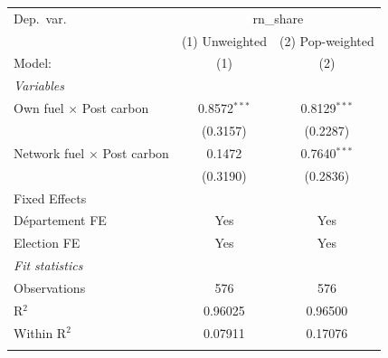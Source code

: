 \begingroup
\centering
\begin{tabular}{lcc}
   \tabularnewline \midrule \midrule
   Dep.\ var. & \multicolumn{2}{c}{rn\_share}\\
                                      & (1) Unweighted & (2) Pop-weighted \\   
   Model:                             & (1)            & (2)\\  
   \midrule
   \emph{Variables}\\
   Own fuel $\times$ Post carbon      & 0.8572$^{***}$ & 0.8129$^{***}$\\   
                                      & (0.3157)       & (0.2287)\\   
   Network fuel $\times$ Post carbon  & 0.1472         & 0.7640$^{***}$\\   
                                      & (0.3190)       & (0.2836)\\   
   \midrule Fixed Effects\\
   D\'{e}partement FE                 & Yes            & Yes\\  
   Election FE                        & Yes            & Yes\\  
   \midrule
   \emph{Fit statistics}\\
   Observations                       & 576            & 576\\  
   R$^2$                              & 0.96025        & 0.96500\\  
   Within R$^2$                       & 0.07911        & 0.17076\\  
   \midrule \midrule & \tabularnewline
\end{tabular}
\par\endgroup
